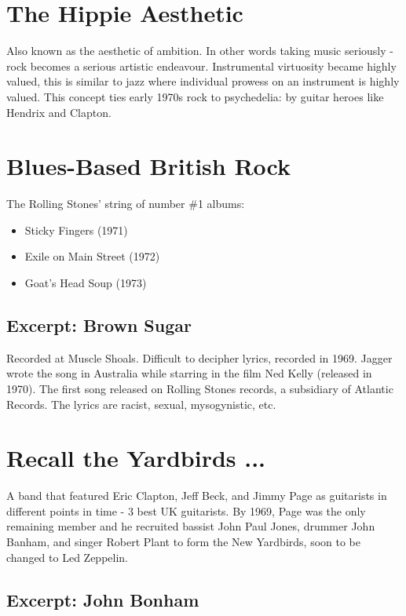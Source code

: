 \documentclass[12pt, a4paper, twoside, openright, titlepage]{book}
\begin{document}
\section{The Hippie Aesthetic}

Also known as the aesthetic of ambition. In other words taking music seriously - rock becomes a serious artistic endeavour. Instrumental virtuosity became highly valued, this is similar to jazz where individual prowess on an instrument is highly valued. This concept ties early 1970s rock to psychedelia: by guitar heroes like Hendrix and Clapton.

\section{Blues-Based British Rock}

The Rolling Stones' string of number \#1 albums: \begin{itemize}
    \item Sticky Fingers (1971)
    \item Exile on Main Street (1972)
    \item Goat's Head Soup (1973)
\end{itemize}

\subsection{Excerpt: Brown Sugar}

Recorded at Muscle Shoals. Difficult to decipher lyrics, recorded in 1969. Jagger wrote the song in Australia while starring in the film Ned Kelly (released in 1970). The first song released on Rolling Stones records, a subsidiary of Atlantic Records. The lyrics are racist, sexual, mysogynistic, etc.

\section{Recall the Yardbirds ...}

A band that featured Eric Clapton, Jeff Beck, and Jimmy Page as guitarists in different points in time - 3 best UK guitarists. By 1969, Page was the only remaining member and he recruited bassist John Paul Jones, drummer John Banham, and singer Robert Plant to form the New Yardbirds, soon to be changed to Led Zeppelin.

\subsection{Excerpt: John Bonham}
\end{document}
